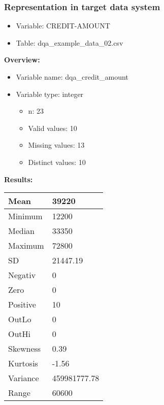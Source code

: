 \documentclass[
]{article}
\providecommand{\tightlist}{%
  \setlength{\itemsep}{0pt}\setlength{\parskip}{0pt}}
\begin{document}
\newpage

\hypertarget{representation-in-target-data-system-1}{%
\subsubsection{\texorpdfstring{Representation in \textbf{target} data
system}{Representation in target data system}}\label{representation-in-target-data-system-1}}

\begin{itemize}
\tightlist
\item
  Variable: CREDIT-AMOUNT
\item
  Table: dqa\_example\_data\_02.csv
\end{itemize}

\textbf{Overview:}

\begin{itemize}
\tightlist
\item
  Variable name: dqa\_credit\_amount
\item
  Variable type: integer

  \begin{itemize}
  \tightlist
  \item
    n: 23
  \item
    Valid values: 10
  \item
    Missing values: 13
  \item
    Distinct values: 10
  \end{itemize}
\end{itemize}

\textbf{Results:}\\

\begin{table}[H]
\centering
\begin{tabular}{l|l}
\hline
Mean & 39220\\
\hline
Minimum & 12200\\
\hline
Median & 33350\\
\hline
Maximum & 72800\\
\hline
SD & 21447.19\\
\hline
Negativ & 0\\
\hline
Zero & 0\\
\hline
Positive & 10\\
\hline
OutLo & 0\\
\hline
OutHi & 0\\
\hline
Skewness & 0.39\\
\hline
Kurtosis & -1.56\\
\hline
Variance & 459981777.78\\
\hline
Range & 60600\\
\hline
\end{tabular}
\end{table}
\end{document}
